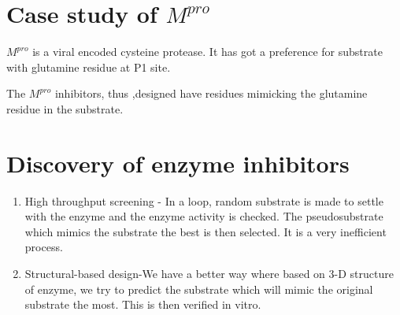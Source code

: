 \documentclass[12pt]{article}
\begin{document}
\section{Case study of $M^{pro}$}
$M^{pro}$ is a viral encoded cysteine protease. It has got a preference for substrate with glutamine residue at P1 site.

The $M^{pro}$ inhibitors, thus ,designed have residues mimicking the glutamine residue in the substrate.
\section{Discovery of enzyme inhibitors}
\begin{enumerate}
\item High throughput screening - In a loop, random substrate is made to settle with the enzyme and the enzyme activity is checked. The pseudosubstrate which mimics the substrate the best is then selected. It is a very inefficient process.
\item Structural-based design-We have a better way where based on 3-D structure of enzyme, we try to predict the substrate which will mimic the original substrate the most. This is then verified in vitro.

\end{enumerate} 
\end{document}

